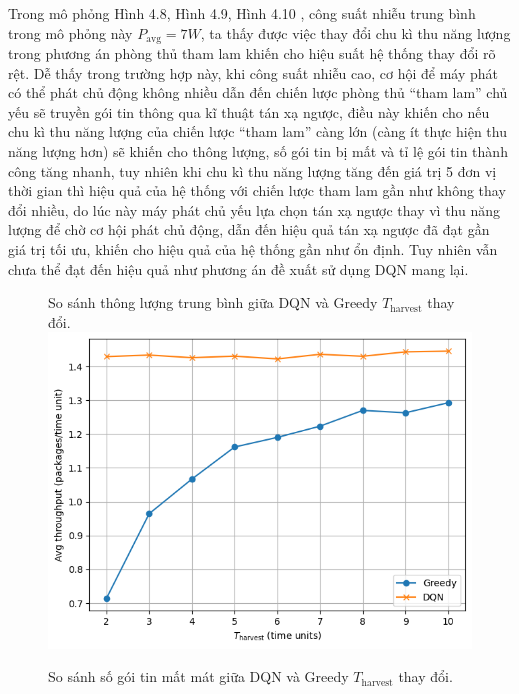 \documentclass{uetgraduation}
\begin{document}
\begin{enumerate}
    Trong mô phỏng Hình 4.8, Hình 4.9, Hình 4.10 , công suất nhiễu trung bình trong mô phỏng này $P_\text{avg} = 7W$, ta thấy được việc thay đổi chu kì thu năng lượng trong 
    phương án phòng thủ tham lam khiến cho hiệu suất hệ thống thay đổi rõ rệt. Dễ thấy trong trường hợp này,  khi công suất nhiễu cao, cơ hội để máy phát có thể phát 
    chủ động không nhiều dẫn đến chiến lược phòng thủ “tham lam” chủ yếu sẽ truyền gói tin thông qua kĩ thuật tán xạ ngược, điều này khiến cho nếu chu kì thu năng lượng 
    của chiến lược “tham lam” càng lớn (càng ít thực hiện thu năng lượng hơn) sẽ khiến cho thông lượng, số gói tin bị mất và tỉ lệ gói tin thành công tăng nhanh, tuy nhiên
    khi chu kì thu năng lượng tăng đến giá trị 5 đơn vị thời gian thì hiệu quả của hệ thống với chiến lược tham lam gần như không thay đổi nhiều, do lúc này máy phát chủ yếu 
    lựa chọn tán xạ ngược thay vì thu năng lượng để chờ cơ hội phát chủ động, dẫn đến hiệu quả tán xạ ngược đã đạt gần giá trị tối ưu, khiến cho hiệu quả của hệ thống gần 
    như ổn định. Tuy nhiên vẫn chưa thể đạt đến hiệu quả như phương án đề xuất sử dụng DQN mang lại.
    \begin{figure}{So sánh thông lượng trung bình giữa DQN và Greedy $T_\text{harvest}$ thay đổi.}
        \centering
        \includegraphics[scale=0.5]{t_harvest_throughput.png}
        \label{fig:t_throughput}
    \end{figure}
    \begin{figure}{So sánh số gói tin mất mát giữa DQN và Greedy $T_\text{harvest}$ thay đổi.}
        \centering

\end{figure}
\end{enumerate}
\end{document}
